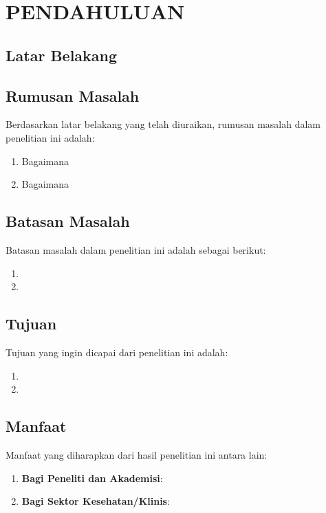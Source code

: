 \chapter{PENDAHULUAN}
\label{chap:pendahuluan}

\paragraphtextstyle

\section{Latar Belakang}
\label{sec:latarbelakang}

\lipsum[1-2]

\section{Rumusan Masalah}
\label{sec:rumusanmasalah}

Berdasarkan latar belakang yang telah diuraikan, rumusan masalah dalam penelitian ini adalah:
\begin{enumerate}
  \item Bagaimana \lipsum[1][1-2]
  \item Bagaimana \lipsum[2][1-2]
\end{enumerate}

\section{Batasan Masalah}
\label{sec:batasanmasalah}

Batasan masalah dalam penelitian ini adalah sebagai berikut:
\begin{enumerate}
  \item \lipsum[3][1-2]
  \item \lipsum[4][1-2]
\end{enumerate}

\section{Tujuan}
\label{sec:tujuan}

Tujuan yang ingin dicapai dari penelitian ini adalah:
\begin{enumerate}
  \item \lipsum[1][1-2]
  \item \lipsum[2][1-2]
\end{enumerate}

\section{Manfaat}
\label{sec:manfaat}

Manfaat yang diharapkan dari hasil penelitian ini antara lain:
\begin{enumerate}
  \item \textbf{Bagi Peneliti dan Akademisi}: \lipsum[1][1-3]
  \item \textbf{Bagi Sektor Kesehatan/Klinis}: \lipsum[2][1-3]
\end{enumerate}

